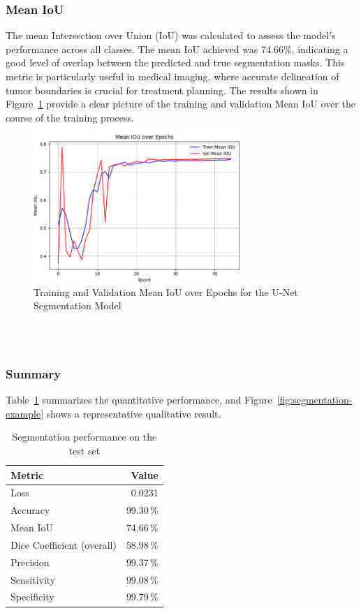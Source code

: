 \subsubsection{Mean IoU}
The mean Intersection over Union (IoU) was calculated to assess the model's performance across all classes. The mean IoU achieved was 74.66\%, indicating a good level of overlap between the predicted and true segmentation masks. This metric is particularly useful in medical imaging, where accurate delineation of tumor boundaries is crucial for treatment planning. The results shown in Figure~\ref{fig:unet-iou} provide a clear picture of the training and validation Mean IoU over the course of the training process.
\begin{figure}[h]
  \centering
  \includegraphics[width=0.7\textwidth]{Images/Chapter3/unet_iou.png}
  \caption{Training and Validation Mean IoU over Epochs for the U-Net Segmentation Model}
  \label{fig:unet-iou}
\end{figure}
\\
\\
\subsubsection{Summary}
Table~\ref{tab:segmentation-results} summarizes the quantitative performance, and Figure~\ref{fig:segmentation-example} shows a representative qualitative result.
\begin{table}[ht]
  \centering
  \caption{Segmentation performance on the test set}
  \label{tab:segmentation-results}
  \begin{tabular}{l r}
    \hline
    \textbf{Metric}            & \textbf{Value} \\
    \hline
    Loss                       & 0.0231         \\
    Accuracy                   & 99.30\,\%      \\
    Mean IoU                   & 74.66\,\%      \\
    Dice Coefficient (overall) & 58.98\,\%      \\
    Precision                  & 99.37\,\%      \\
    Sensitivity                & 99.08\,\%      \\
    Specificity                & 99.79\,\%      \\
    \hline
  \end{tabular}
\end{table}

